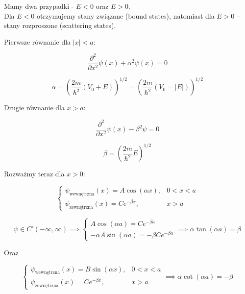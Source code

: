 Mamy dwa przypadki - $E < 0$ oraz $E > 0$. \\
Dla $E < 0$ otrzymujemy stany związane (bound states), natomiast dla $E > 0$ – stany
rozproszone (scattering states).


Pierwsze równanie dla $|x| < a$:

\begin{equation*}
    \frac{\partial^2}{\partial x^2} \psi(x) + \alpha^2 \psi(x) = 0
\end{equation*}

\begin{equation*}
    \alpha = \left( \frac{2m}{\hbar^2}(V_0 + E) \right)^{1/2} = \left( \frac{2m}{\hbar^2}(V_0 = |E|) \right)^{1/2}
\end{equation*}


Drugie równanie dla $x > a$:

\begin{equation*}
    \frac{\partial^2}{\partial x^2} \psi(x) - \beta^2 \psi = 0
\end{equation*}

\begin{equation*}
    \beta = \left( \frac{2m}{\hbar^2} E \right)^{1/2}
\end{equation*}

Rozważmy teraz dla $x > 0$:

\begin{equation*}
    \begin{cases}
        \psi_{\text{wewnętrzna}}(x) = A \cos(\alpha x), & 0 < x < a \\
        \psi_{\text{zewnętrzna}}(x) = C e^{-\beta x}, & x > a
    \end{cases}
\end{equation*}


\begin{equation*}
    \psi \in C'(-\infty, \infty) \implies
    \begin{cases}
        A \cos(\alpha a) = C e^{-\beta a} \\
        - \alpha A \sin(\alpha a) = - \beta C e^{-\beta a}
    \end{cases}
    \implies
    \alpha \tan(\alpha a) = \beta
\end{equation*}


Oraz

\begin{equation*}
    \begin{cases}
        \psi_{\text{wewnętrzna}}(x) = B \sin(\alpha x), & 0 < x < a \\
        \psi_{\text{zewnętrzna}}(x) = C e^{-\beta x}, & x > a
    \end{cases}
    \implies
    \alpha \cot(\alpha a) = -\beta
\end{equation*}


